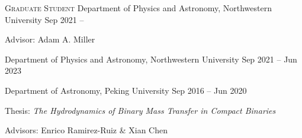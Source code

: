 


\begin{cventries}



\cvsimpentry
{{\scshape Graduate Student}} %
{Department of Physics and Astronomy, Northwestern University} %
{Sep 2021 -- } %
{ \begin{cvitems}
	\item {Advisor: Adam A. Miller}
\end{cvitems}
}

\cvsimpentry
{} %
{Department of Physics and Astronomy, Northwestern University} %
{Sep 2021 -- Jun 2023} %
{}

\cvsimpentry
{} %
{Department of Astronomy, Peking University} %
{Sep 2016 -- Jun 2020} %
{ %
	\begin{cvitems}
		\item {Thesis: \textit{The Hydrodynamics of Binary Mass Transfer in Compact Binaries}}
		\item {Advisors: Enrico Ramirez-Ruiz \& Xian Chen}
	\end{cvitems}
}

\end{cventries}